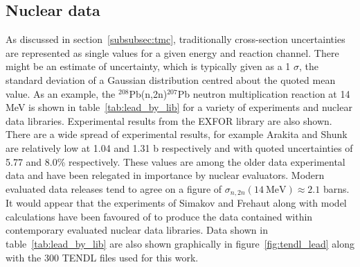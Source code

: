 \subsection{Nuclear data}
\label{subsec:data}
As discussed in section~\ref{subsubsec:tmc}, traditionally cross-section uncertainties are represented as single values for a given energy and reaction channel. There might be an estimate of uncertainty, which is typically given as a 1 $\sigma$, the standard deviation of a Gaussian distribution centred about the quoted mean value. As an example, the $^{208}$Pb(n,2n)$^{207}$Pb neutron multiplication reaction at 14 MeV is shown in table~\ref{tab:lead_by_lib} for a variety of experiments and nuclear data libraries. Experimental results from the EXFOR library are also shown. There are a wide spread of experimental results, for example Arakita and Shunk are relatively low at 1.04 and 1.31 b respectively and with quoted uncertainties of 5.77 and 8.0\% respectively. These values are among the older data experimental data and have been relegated in importance by nuclear evaluators. Modern evaluated data releases tend to agree on a figure of $\sigma_{n,2n}(14\ \mathrm{MeV}) \approx 2.1$ barns. It would appear that the experiments of Simakov and Frehaut along with model calculations have been favoured of to produce the data contained within contemporary evaluated nuclear data libraries. Data shown in table~\ref{tab:lead_by_lib} are also shown graphically in figure~\ref{fig:tendl_lead} along with the 300 TENDL files used for this work.

